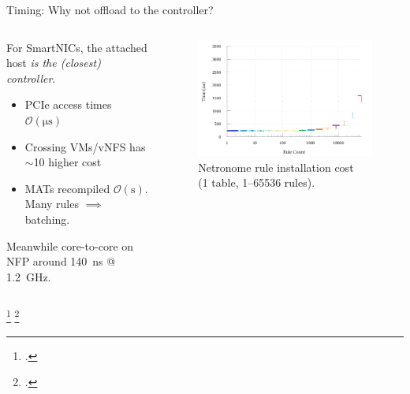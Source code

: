 \documentclass[aspectratio=169,xcolor={dvipsnames}
,handout
]{beamer}
\begin{document}
\begin{frame}{Timing: Why not offload to the controller?}
	\begin{columns}
		\begin{column}{0.5\linewidth}
			For SmartNICs, the attached host \emph{is the (closest) controller}.
			
			\begin{itemize}
				\item PCIe access times $\mathcal{O}(\si{\micro\second})$\footnotemark
				\item Crossing VMs/vNFS has $\sim$\qty{10}{\times} higher cost\footnotemark
				\item MATs recompiled $\mathcal{O}(\si{\second})$. Many rules $\implies$ batching.
			\end{itemize}
			
			
			\alert{Meanwhile core-to-core on NFP around \SI{140}{\nano\second} @ \SI{1.2}{\giga\hertz}.}
		\end{column}
		\begin{column}{0.5\linewidth}
			\begin{figure}
				\includegraphics[width=0.9\linewidth]{../plots/build/rte-timer/rte-times-logx}
				\caption{Netronome rule installation cost \\(1 table, \numrange{1}{65536} rules).}
			\end{figure}
		\end{column}
	\end{columns}
	\setcounter{footnote}{4}
	\footcitetext{DBLP:conf/sigcomm/NeugebauerAZAL018}
	\setcounter{footnote}{5}
	\footcitetext{DBLP:journals/cm/CzivaP17}
\end{frame}
\end{document}
